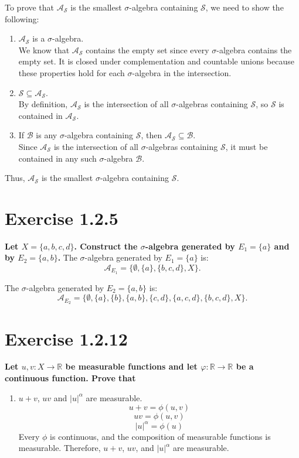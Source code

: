 \documentclass[11pt]{article}
\begin{document}
To prove that \(\mathcal{A}_\mathcal{S}\) is the smallest \(\sigma\)-algebra containing \(\mathcal{S}\), we need to show the following:
\begin{enumerate}
    \item \(\mathcal{A}_\mathcal{S}\) is a \(\sigma\)-algebra. \\
    We know that \(\mathcal{A}_\mathcal{S}\) contains the empty set since every \(\sigma\)-algebra contains the empty set. It is closed under complementation and countable unions because these properties hold for each \(\sigma\)-algebra in the intersection.

    \item \(\mathcal{S} \subseteq \mathcal{A}_\mathcal{S}\). \\
    By definition, \(\mathcal{A}_\mathcal{S}\) is the intersection of all \(\sigma\)-algebras containing \(\mathcal{S}\), so \(\mathcal{S}\) is contained in \(\mathcal{A}_\mathcal{S}\).

    \item If \(\mathcal{B}\) is any \(\sigma\)-algebra containing \(\mathcal{S}\), then \(\mathcal{A}_\mathcal{S} \subseteq \mathcal{B}\). \\
    Since \(\mathcal{A}_\mathcal{S}\) is the intersection of all \(\sigma\)-algebras containing \(\mathcal{S}\), it must be contained in any such \(\sigma\)-algebra \(\mathcal{B}\).
    
\end{enumerate}

Thus, \(\mathcal{A}_\mathcal{S}\) is the smallest \(\sigma\)-algebra containing \(\mathcal{S}\).

\section*{Exercise 1.2.5}
\textbf{\large Let \(X = \{a, b, c, d\}\). Construct the \(\sigma\)-algebra generated by \(E_1 = \{{a}\}\) and by \(E_2 = \{{a}, {b}\}\).}
The \(\sigma\)-algebra generated by \(E_1 = \{a\}\) is:
\[\mathcal{A}_{E_1} = \{\emptyset, \{a\}, \{b, c, d\}, X\}.\]

The \(\sigma\)-algebra generated by \(E_2 = \{a, b\}\) is:
\[\mathcal{A}_{E_2} = \{\emptyset, \{a\}, \{b\}, \{a, b\}, \{c, d\}, \{a, c, d\}, \{b, c, d\}, X\}.\]

\section*{Exercise 1.2.12}
\textbf{\large Let \(u, v : X \to \mathbb{R}\) be measurable functions and let \(\varphi : \mathbb{R} \to \mathbb{R}\) be a continuous function. Prove that}
\begin{enumerate}
    \item \(u + v\), \(uv\) and \(|u|^\alpha\) are measurable.
    \[u + v = \phi(u, v)\]
    \[uv = \phi(u, v)\]
    \[|u|^\alpha = \phi(u)\]
    Every \(\phi\) is continuous, and the composition of measurable functions is measurable. Therefore, \(u + v\), \(uv\), and \(|u|^\alpha\) are measurable.
\end{enumerate}
\end{document}
